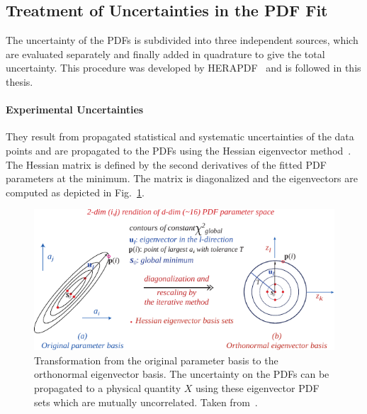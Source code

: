 \subsection{Treatment of Uncertainties in the PDF Fit}
\label{section:treatment_pdf_uncertainties}

The uncertainty of the PDFs is subdivided into three independent sources, which
are evaluated separately and finally added in quadrature to give the total
uncertainty. This procedure was developed by HERAPDF~\cite{Abramowicz:2015mha}
and is followed in this thesis.

\paragraph{Experimental Uncertainties} 
They result from propagated statistical and systematic uncertainties of the data
points and are propagated to the PDFs using the Hessian eigenvector
method~\cite{Pumplin:2001ct}. The Hessian matrix is defined by the second
derivatives of the fitted PDF parameters at the \chisq minimum. The matrix is
diagonalized and the eigenvectors are computed as depicted in
Fig.~\ref{fig:eigenvector_basis_set}. 

\begin{figure}[htb]
  \centering
  \includegraphics[width=1.0\textwidth]{figures/pdf_constraints/hessianmethod.pdf}
  \caption[Transformation of the parameter basis to the eigenvector basis]
    {Transformation from the original parameter basis to the orthonormal
    eigenvector basis. The uncertainty on the PDFs can be propagated to a
    physical quantity $X$ using these eigenvector PDF sets which are mutually
    uncorrelated. Taken from~\cite{Pumplin:2001ct}.}
    \label{fig:eigenvector_basis_set}
\end{figure}

